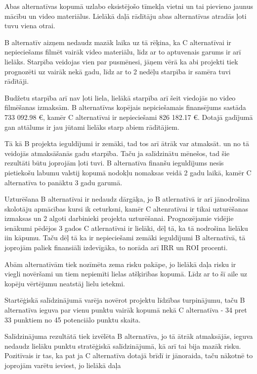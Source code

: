 Abas alternatīvas kopumā uzlabo eksistējošo tīmekļa vietni un tai pievieno jaunus mācību un
video materiālus. Lielākā daļā rādītāju abas alternatīvas atradās ļoti tuvu viena otrai. 
\par
B alternatīv aizņem nedaudz mazāk laika uz tā rēķina, ka C alternatīvai ir nepieciešams filmēt 
vairāk video materiālu, līdz ar to aptuvenais garums ir arī lielāks. Starpība veidojas vien par
pusmēnesi, jāņem vērā ka abi projekti tiek prognozēti uz vairāk nekā gadu, līdz ar to 2 nedēļu starpība
ir samēra tuvi rādītāji.
\par
Budžetu starpība arī nav ļoti liela, lielākā starpība arī šeit viedojās no video filmēšanas izmaksām.
B alternatīvas kopējais nepiciešamais finansējums sastāda 733 092.98 €, kamēr C alternatīvai ir nepieciešami
826 182.17 €. Dotajā gadījumā gan attālums ir jau jūtami lielāks starp abiem rādītājiem.
\par
Tā kā B projekta ieguldījumi ir zemāki, tad tos arī ātrāk var atmaksāt. un no tā veidojās atmaksāšanās
gadu starpība. Taču ja salīdzinātu mēnešos, tad šie rezultāti būtu joprojām ļoti tuvi. B alternatīva 
finanšu ieguldījums nesīs pietiekošu labumu valstij kopumā nodokļu nomaksas veidā 2 gadu laikā, kamēr
C alternatīva to panāktu 3 gadu garumā.
\par
Uzturēšana B alternatīvai ir nedaudz dārgāķa, jo B atlernatīvā ir arī jānodrošina skolotāju apmācības
kursi ik ceturksni, kamēr C altenratīvai ir tikai uzturēšanas izmaksas un 2 algoti darbinieki 
projekta uzturēšanai. Prognozējamie vidējie ienākumi pēdējos 3 gados C atlernatīvai ir lielāki, dēļ 
tā, ka tā nodrošina lielāku \acrshort{iin} kāpumu. Taču dēļ tā ka ir nepieciešami zemāki ieguldījumi
B alternatīvā, tā joprojām paliek finansiāli izdevīgāka, to norāda arī IRR un ROI procenti.
\par
Abām alternatīvām tiek nozīmēta zema risku pakāpe, jo lielākā daļa risku ir viegli novēršami un tiem
nepiemīti lielas atšķirības kopumā. Līdz ar to šī aile uz kopēju vērtējumu neatstāj lielu ietekmi.
\par
Startēģiskā salīdzinājumā varēja novērot projektu līdzības turpinājumu, taču B alternatīva ieguva
par vienu punktu vairāk kopumā nekā C alternatīva - 34 pret 33 punktiem no 45 potenciālo punktu
skaita. 
\par
Salīdzinājuma rezultātā tiek izvēlēta B alternatīva, jo tā ātrāk atmaksājās, ieguva nedaudz lielāku
punktu stratēģiskā salīdzinājumā, kā arī tai bija mazāk risku. Pozitīvais ir tas, ka pat ja C 
alternatīva dotajā brīdī ir jānoraida, taču nākotnē to joprojām varētu ieviest, jo lielākā daļa
